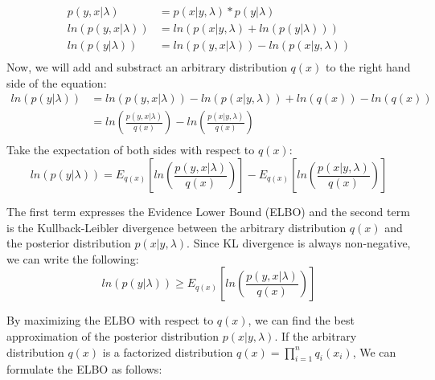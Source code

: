 \documentclass{article}
\begin{document}
\[
    \begin{aligned}
        p(y,x|\lambda) &= p(x|y,\lambda)*p(y|\lambda) \\
        ln(p(y,x|\lambda)) &= ln(p(x|y,\lambda)+ ln(p(y|\lambda))) \\
        ln(p(y|\lambda)) &= ln(p(y,x|\lambda)) - ln(p(x|y,\lambda)) \\
    \end{aligned}
\]
Now, we will add and substract an arbitrary distribution $q(x)$ to the right hand side of the equation:
\[
    \begin{aligned}
        ln(p(y|\lambda)) &= ln(p(y,x|\lambda)) - ln(p(x|y,\lambda)) + ln(q(x)) - ln(q(x))\\
                         &= ln(\frac{p(y,x|\lambda)}{q(x)}) - ln(\frac{p(x|y,\lambda)}{q(x)}) \\
    \end{aligned}
\]
Take the expectation of both sides with respect to $q(x)$:
\begin{equation}
    ln(p(y|\lambda)) = E_{q(x)}\left[ ln(\frac{p(y,x|\lambda)}{q(x)}) \right] - E_{q(x)}\left[ ln(\frac{p(x|y,\lambda)}{q(x)}) \right]
\end{equation}

The first term expresses the Evidence Lower Bound (ELBO) and the second term is the Kullback-Leibler divergence between the arbitrary distribution
$q(x)$ and the posterior distribution $p(x|y,\lambda)$. Since KL divergence is always non-negative, we can write the following:
\[
    ln(p(y|\lambda)) \geq E_{q(x)}\left[ ln(\frac{p(y,x|\lambda)}{q(x)}) \right]
\] 

By maximizing the ELBO with respect to $q(x)$, we can find the best approximation of the posterior distribution $p(x|y,\lambda)$.
If the arbitrary distribution $q(x)$ is a factorized distribution $q(x) = \prod_{i=1}^{n} q_i(x_i)$, We can formulate the ELBO as follows:
\end{document}
